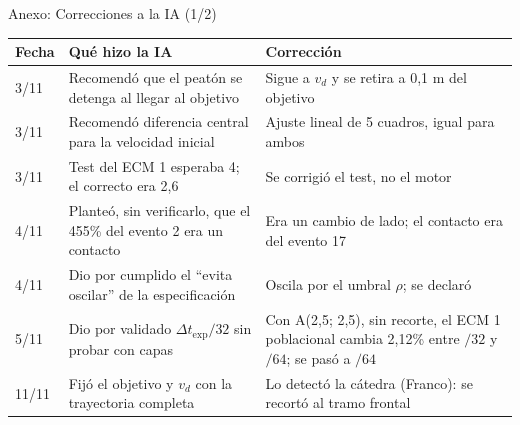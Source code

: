 \documentclass[aspectratio=43,11pt]{beamer}
\begin{document}
\newcommand{\corrhead}{\hline \textbf{Fecha} & \textbf{Qué hizo la IA} & \textbf{Corrección} \\ \hline}
\begin{frame}{Anexo: Correcciones a la IA (1/2)}
  \scriptsize\renewcommand{\arraystretch}{1.3}
  \begin{tabular}{@{}p{0.9cm}p{5.2cm}p{4.75cm}@{}}
    \corrhead
    3/11 & Recomendó que el peatón se detenga al llegar al objetivo & Sigue a $v_d$ y se retira a 0,1 m del objetivo \\
    3/11 & Recomendó diferencia central para la velocidad inicial & Ajuste lineal de 5 cuadros, igual para ambos \\
    3/11 & Test del ECM 1 esperaba 4; el correcto era 2,6 & Se corrigió el test, no el motor \\
    4/11 & Planteó, sin verificarlo, que el 455\% del evento 2 era un contacto & Era un cambio de lado; el contacto era del evento 17 \\
    4/11 & Dio por cumplido el ``evita oscilar'' de la especificación & Oscila por el umbral $\rho$; se declaró \\
    5/11 & Dio por validado $\Delta t_{\mathrm{exp}}/32$ sin probar con capas & Con A(2,5; 2,5), sin recorte, el ECM 1 poblacional cambia 2,12\% entre $/32$ y $/64$; se pasó a $/64$ \\
    11/11 & Fijó el objetivo y $v_d$ con la trayectoria completa & Lo detectó la cátedra (Franco): se recortó al tramo frontal \\
    \hline
  \end{tabular}
\end{frame}
\end{document}
